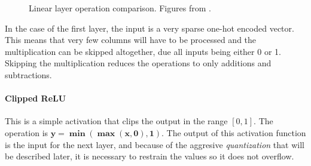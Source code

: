 \begin{figure}[H]
\centering
{}%
\qquad
{}%
\caption{Linear layer operation comparison. Figures from \cite{nnue-pytorch}.}
\label{fig:linear_comparison}
\end{figure}

In the case of the first layer, the input is a very sparse one-hot encoded vector. This means that very few columns will have to be processed and the multiplication can be skipped altogether, due all inputs being either 0 or 1. Skipping the multiplication reduces the operations to only additions and subtractions.

\paragraph[short]{Clipped ReLU} This is a simple activation that clips the output in the range $[0, 1]$. The operation is $\bm{y=\min(\max(x,0),1)}$.
The output of this activation function is the input for the next layer, and because of the aggresive \textit{quantization} that will be described later, it is necessary to restrain the values so it does not overflow. \\

